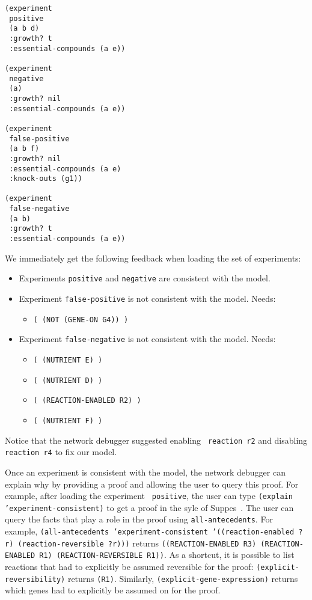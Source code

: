 \begin{lstlisting}[label={listing:experiments},caption={Experiments}]
(experiment 
 positive 
 (a b d) 
 :growth? t 
 :essential-compounds (a e))

(experiment 
 negative 
 (a) 
 :growth? nil 
 :essential-compounds (a e))

(experiment 
 false-positive 
 (a b f) 
 :growth? nil 
 :essential-compounds (a e) 
 :knock-outs (g1))

(experiment
 false-negative
 (a b)
 :growth? t
 :essential-compounds (a e))
\end{lstlisting}

We immediately get the following feedback when loading the set of
experiments:
\begin{itemize}
\item Experiments {\small\tt positive} and {\small\tt negative} are consistent with the model.
\item Experiment {\small\tt false-positive} is not consistent with the model. Needs:
\begin{itemize}
\item {\small\tt ( (NOT (GENE-ON G4)) )}
\end{itemize}
\item Experiment {\small\tt false-negative} is not consistent with the model. Needs:
\begin{itemize}
\item {\small\tt ( (NUTRIENT E) )}
\item {\small\tt ( (NUTRIENT D) )}
\item {\small\tt ( (REACTION-ENABLED R2) )}
\item {\small\tt ( (NUTRIENT F) )}
\end{itemize}
\end{itemize}

Notice that the network debugger suggested enabling {\small\tt
reaction r2} and disabling {\small\tt reaction r4} to fix our model.

Once an experiment is consistent with the model, the network debugger
can explain why by providing a proof and allowing the user to query
this proof. For example, after loading the experiment {\small\tt
positive}, the user can type {\small\tt (explain
'experiment-consistent)} to get a proof in the syle of
Suppes~\cite{suppes57}. The user can query the facts that play a role
in the proof using {\small\tt all-antecedents}. For example,
{\small\tt (all-antecedents 'experiment-consistent '((reaction-enabled
?r) (reaction-reversible ?r)))} returns {\small\tt ((REACTION-ENABLED
R3) (REACTION-ENABLED R1) (REACTION-REVERSIBLE R1))}. As a shortcut,
it is possible to list reactions that had to explicitly be assumed
reversible for the proof: {\small\tt (explicit-reversibility)} returns
{\small\tt (R1)}. Similarly, {\small\tt (explicit-gene-expression)}
returns which genes had to explicitly be assumed on for the proof.

